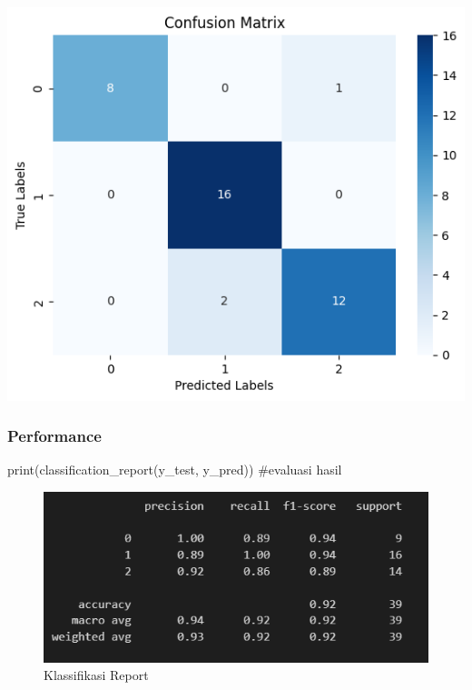 \documentclass[
  letterpaper,
  DIV=11,
  numbers=noendperiod]{scrreprt}
\newenvironment{Shaded}{\begin{snugshade}}{\end{snugshade}}
\newcommand{\BuiltInTok}[1]{\textcolor[rgb]{0.00,0.23,0.31}{#1}}
\newcommand{\CommentTok}[1]{\textcolor[rgb]{0.37,0.37,0.37}{#1}}
\newcommand{\NormalTok}[1]{\textcolor[rgb]{0.00,0.23,0.31}{#1}}
\begin{document}
\includegraphics{Asset/confusion_knn_optimasi.png}

\hypertarget{performance-1}{%
\subsubsection*{Performance}\label{performance-1}}

\begin{Shaded}
\begin{Highlighting}[]
\BuiltInTok{print}\NormalTok{(classification\_report(y\_test, y\_pred)) }\CommentTok{\#evaluasi hasil  }
\end{Highlighting}
\end{Shaded}

\begin{figure}

{\centering \includegraphics{Asset/classreport_knn_optimasi.png}

}

\caption{Klassifikasi Report}

\end{figure}
\end{document}
